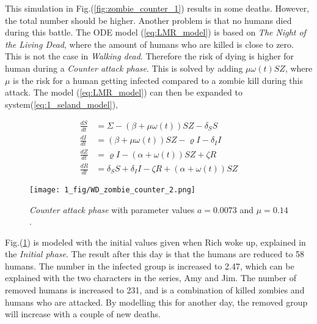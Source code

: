 \documentclass[%
twoside,                 %
final,                   %
chapterprefix=true,      %
open=right               %
10pt]{book}
\begin{document}
This simulation in Fig.(\ref{fig:zombie_counter_1}) results in some deaths. However, the total number should be higher. Another problem is that no humans died during this battle. The ODE model (\ref{eq:LMR_model}) is based on \emph{The Night of the Living Dead}, where the amount of humans who are killed is close to zero. This is not the case in \emph{Walking dead}. Therefore the risk of dying is higher for human during a \emph{Counter attack phase}. This is solved by adding $\mu \omega (t) SZ$, where $\mu$ is the risk for a human getting infected compared to a zombie kill during this attack. The model (\ref{eq:LMR_model}) can then be expanded to system(\ref{eq:1_seland_model}),

\begin{equation} \label{eq:1_seland_model}
	\begin{aligned} 
	\frac{dS}{dt} &= \Sigma -(\beta+\mu \omega(t))SZ - \delta_SS \\
	\frac{dI}{dt} &= (\beta+\mu \omega(t))SZ - \varrho I - \delta_II\\
	\frac{dZ}{dt} &= \varrho I- (\alpha+\omega(t))SZ + \zeta R\\
	\frac{dR}{dt} &= \delta_SS +\delta_II -\zeta R + (\alpha+\omega(t))SZ 
	\end{aligned}
\end{equation}


\begin{figure}[ht]
  \centerline{\texttt{[image: 1\_fig/WD\_zombie\_counter\_2.png]}}
  \caption{
  \label{fig:zombie_counter_2} \emph{Counter attack phase} with parameter values $a=0.0073$ and $\mu=0.14$.
  }
\end{figure}


Fig.(\ref{fig:zombie_counter_2}) is modeled with the initial values given when Rich woke up, explained in the \emph{Initial phase}. The result after this day is that the humans are reduced to 58 humans. The number in the infected group is increased to 2.47, which can be explained with the two characters in the series, Amy and Jim. The number of removed humans is increased to 231, and is a combination of killed zombies and humans who are attacked. By modelling this for another day, the removed group will increase with a couple of new deaths. 


\vspace{3mm}




\vspace{3mm}
\end{document}
